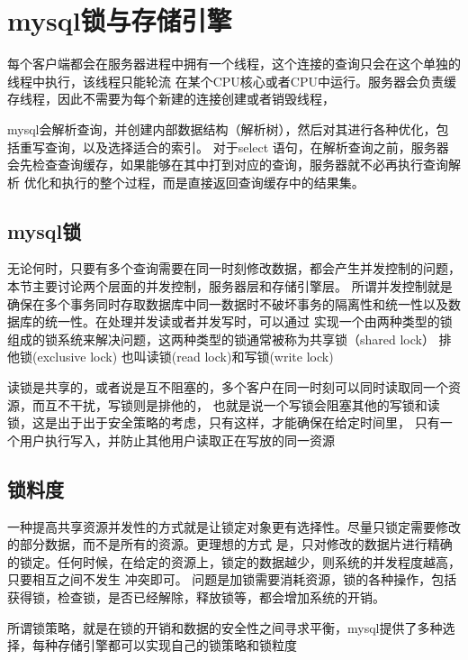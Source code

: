 \documentclass[cyan]{article}
\begin{document}
\maketitle
\tableofcontents

\chapter{mysql锁与存储引擎}

每个客户端都会在服务器进程中拥有一个线程，这个连接的查询只会在这个单独的线程中执行，该线程只能轮流
在某个CPU核心或者CPU中运行。服务器会负责缓存线程，因此不需要为每个新建的连接创建或者销毁线程，

mysql会解析查询，并创建内部数据结构（解析树），然后对其进行各种优化，包括重写查询，以及选择适合的索引。
对于select 语句，在解析查询之前，服务器会先检查查询缓存，如果能够在其中打到对应的查询，服务器就不必再执行查询解析
优化和执行的整个过程，而是直接返回查询缓存中的结果集。

\section{mysql锁}

无论何时，只要有多个查询需要在同一时刻修改数据，都会产生并发控制的问题，本节主要讨论两个层面的并发控制，服务器层和存储引擎层。
所谓并发控制就是确保在多个事务同时存取数据库中同一数据时不破坏事务的隔离性和统一性以及数据库的统一性。在处理并发读或者并发写时，可以通过
实现一个由两种类型的锁组成的锁系统来解决问题，这两种类型的锁通常被称为共享锁（shared lock） 排他锁(exclusive lock)
也叫读锁(read lock)和写锁(write lock)

读锁是共享的，或者说是互不阻塞的，多个客户在同一时刻可以同时读取同一个资源，而互不干扰，写锁则是排他的，
也就是说一个写锁会阻塞其他的写锁和读锁，这是出于出于安全策略的考虑，只有这样，才能确保在给定时间里，
只有一个用户执行写入，并防止其他用户读取正在写放的同一资源

\section{锁料度}
一种提高共享资源并发性的方式就是让锁定对象更有选择性。尽量只锁定需要修改的部分数据，而不是所有的资源。更理想的方式
是，只对修改的数据片进行精确的锁定。任何时候，在给定的资源上，锁定的数据越少，则系统的并发程度越高，只要相互之间不发生
冲突即可。
问题是加锁需要消耗资源，锁的各种操作，包括获得锁，检查锁，是否已经解除，释放锁等，都会增加系统的开销。

所谓锁策略，就是在锁的开销和数据的安全性之间寻求平衡，mysql提供了多种选择，每种存储引擎都可以实现自己的锁策略和锁粒度
\end{document}
